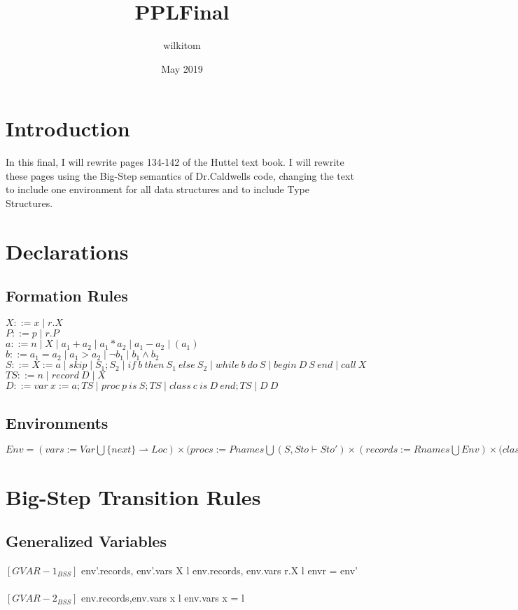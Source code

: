 \documentclass{article}
\title{PPLFinal}
\author{wilkitom }
\date{May 2019}
\begin{document}
\maketitle

\section{Introduction}
In this final, I will rewrite pages 134-142 of the Huttel text book. I will rewrite these pages using the Big-Step semantics of Dr.Caldwells code, changing the text to include one environment for all data structures and to include Type Structures. 

\section{Declarations}
\subsection{Formation Rules}
$X ::= x \mid r.X$\\
$P ::= p \mid r.P$\\
$a ::= n \mid X \mid a_1+a_2 \mid a_1*a_2 \mid a_1-a_2 \mid (a_1)$\\
$b ::= a_1 = a_2 \mid a_1 > a_2 \mid \neg b_1 \mid b_1 \wedge b_2$\\
$S ::= X := a \mid skip \mid S_1 ; S_2 \mid if \: b \: then \: S_1 \: else \: S_2 \mid while \: b \: do \: S \mid begin \: D \: S \: end \mid call \: X$\\
$TS ::= n \mid record \: D \mid X$\\
$D ::= var \: x := a;TS \mid proc \:p\: is\: S;TS \mid class\: c\: is \:D \:end;TS \mid D\: D$

\subsection{Environments}
$Env = (vars := Var \bigcup \{next\} \rightharpoonup Loc) \times (procs := Pnames \bigcup (S, Sto \vdash Sto') \times (records := Rnames\bigcup Env) \times (classes := Cnames \bigcup (TS \vdash TS', Sto \vdash Sto')$

\section{Big-Step Transition Rules}
\subsection{Generalized Variables}
$[GVAR-1_{BSS}]$
\stackedRuleWhere
{env'.records, env'.vars \vdash X \to l}
{env.records, env.vars \vdash r.X \to l}
{envr = env'}\\
\\
$[GVAR-2_{BSS}]$
\withWhere
{env.records,env.vars \vdash x \to l}
{\hspace{2cm}env.vars x = l}
\end{document}
